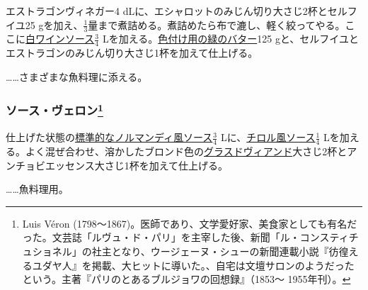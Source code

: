 \begin{recette}


エストラゴンヴィネガー4
dLに、エシャロットのみじん切り大さじ2杯とセルフイユ25
gを加え、\(\frac{1}{3}\)量まで煮詰める。煮詰めたら布で漉し、軽く絞ってやる。ここに\protect\hyperlink{sauce-vin-blanc}{白ワインソース}\(\frac{3}{4}\)
Lを加える。\protect\hyperlink{beurre-colorant-vert}{色付け用の緑のバター}125
gと、セルフイユとエストラゴンのみじん切り大さじ1杯を加えて仕上げる。

\ldots{}\ldots{}さまざまな魚料理に添える。

\hypertarget{sauce-veron}{%
\subsubsection[ソース・ヴェロン]{\texorpdfstring{ソース・ヴェロン\footnote{Luis
  Véron
  (1798〜1867)。医師であり、文学愛好家、美食家としても有名だった。文芸誌「ルヴュ・ド・パリ」を主宰した後、新聞「ル・コンスティチュショネル」の社主となり、ウージェーヌ・シューの新聞連載小説『彷徨えるユダヤ人』を掲載、大ヒットに導いた。、自宅は文壇サロンのようだったという。主著『パリのとあるブルジョワの回想録』（1853〜
  1955年刊）。}}{ソース・ヴェロン}}\label{sauce-veron}}


 

仕上げた状態の\protect\hyperlink{sauce-normande}{標準的なノルマンディ風ソース}\(\frac{3}{4}\)
Lに、\protect\hyperlink{sauce-tyrolienne}{チロル風ソース}\(\frac{1}{4}\)
Lを加える。よく混ぜ合わせ、溶かしたブロンド色の\protect\hyperlink{glace-de-viande}{グラスドヴィアンド}大さじ2杯とアンチョビエッセンス大さじ1杯を加えて仕上げる。

\ldots{}\ldots{}魚料理用。

\hypertarget{sauce-villageoise}{%
}
\end{recette}
